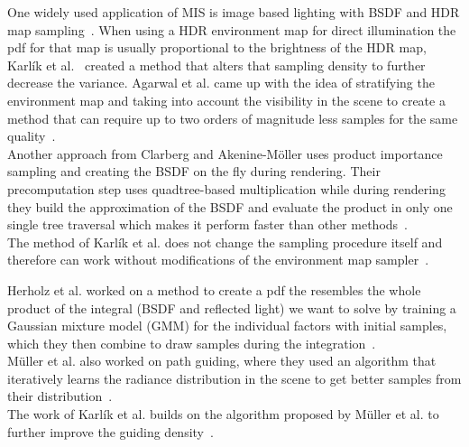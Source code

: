One widely used application of MIS is image based lighting with BSDF and HDR map sampling~\cite{pbr-book}.
When using a HDR environment map for direct illumination the pdf for that map is usually proportional to the brightness of the HDR map,
Karl\'ik et al.~\cite{Karlik2019} created a method that alters that sampling density to further decrease the variance.
Agarwal et al. came up with the idea of stratifying the environment map
and taking into account the visibility in the scene
to create a method that can require up to two orders of magnitude less samples for the same quality~\cite{agarwal}.\\
Another approach from Clarberg and Akenine-Möller uses product importance sampling
and creating the BSDF on the fly during rendering.
Their precomputation step uses quadtree-based multiplication while during rendering they build the approximation of the BSDF
and evaluate the product in only one single tree traversal which makes it perform faster than other methods~\cite{clarberg}.\\
The method of Karl\'ik et al. does not change the sampling procedure itself and therefore can work without modifications of the environment map sampler~\cite{Karlik2019}.

Herholz et al. worked on a method to create a pdf the resembles the whole product of the integral (BSDF and reflected light) we want to solve
by training a Gaussian mixture model (GMM) for the individual factors with initial samples,
which they then combine to draw samples during the integration~\cite{Herholz}.\\
M\"uller et al. also worked on path guiding,
where they used an algorithm that iteratively learns the radiance distribution in the scene to get better samples from their distribution~\cite{mueller2017}.\\
The work of Karl\'ik et al. builds on the algorithm proposed by M\"uller et al. to further improve the guiding density~\cite{Karlik2019}.